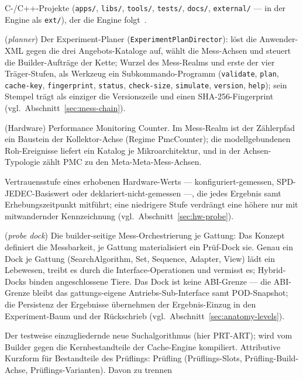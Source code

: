 \begin{description}
  C-/C++-Projekte (\texttt{apps/}, \texttt{libs/}, \texttt{tools/}, \texttt{tests/},
  \texttt{docs/}, \texttt{external/} --- in der Engine als \texttt{ext/}), der die Engine
  folgt~\cite{pike2018pitchfork}.
  \item[Planer] (\emph{planner}) Der Experiment-Planer (\texttt{ExperimentPlanDirector}): löst die
  Anwender-XML gegen die drei Angebots-Kataloge auf, wählt die Mess-Achsen und steuert die
  Builder-Aufträge der Kette; Wurzel des Mess-Realms und erste der vier Träger-Stufen, als Werkzeug
  ein Subkommando-Programm (\texttt{validate}, \texttt{plan}, \texttt{cache-key}, \texttt{fingerprint},
  \texttt{status}, \texttt{check-size}, \texttt{simulate}, \texttt{version}, \texttt{help}); sein Stempel
  trägt als einziger die Versionszeile und einen SHA-256-Fingerprint (vgl.\ Abschnitt~\ref{sec:mess-chain}).
  \item[PMC] (Hardware) Performance Monitoring Counter. Im Mess-Realm ist der Zählerpfad ein
  Baustein der Kollektor-Achse (Regime PmcCounter); die modellgebundenen Roh-Ereignisse liefert ein
  Katalog je Mikroarchitektur, und in der Achsen-Typologie zählt PMC zu den Meta-Meta-Mess-Achsen.
  \item[Provenienz-Stufe] Vertrauensstufe eines erhobenen Hardware-Werts --- konfiguriert-gemessen,
  SPD-JEDEC-Basiswert oder deklariert-nicht-gemessen ---, die jedes Ergebnis samt
  Erhebungszeitpunkt mitführt; eine niedrigere Stufe verdrängt eine höhere nur mit mitwandernder
  Kennzeichnung (vgl.\ Abschnitt~\ref{sec:hw-probe}).
  \item[Prüf-Dock] (\emph{probe dock}) Die builder-seitige Mess-Orchestrierung je Gattung: Das Konzept
  definiert die Messbarkeit, je Gattung materialisiert ein Prüf-Dock sie. Genau ein
  Dock je Gattung (SearchAlgorithm, Set, Sequence, Adapter, View) lädt ein Lebewesen, treibt es durch
  die Interface-Operationen und vermisst es; Hybrid-Docks binden angeschlossene Tiere. Das Dock ist
  keine ABI-Grenze --- die ABI-Grenze bleibt das gattungs-eigene Antriebs-Sub-Interface samt
  POD-Snapshot; die Persistenz der Ergebnisse übernehmen der Ergebnis-Einzug in den
  Experiment-Baum und der Rückschrieb (vgl.\ Abschnitt~\ref{sec:anatomy-levels}).
  \item[Prüfling] Der testweise einzugliedernde neue Suchalgorithmus (hier PRT-ART); wird vom
  Builder gegen die Kernbestandteile der Cache-Engine kompiliert. Attributive Kurzform für Bestandteile
  des Prüflings: Prüfling (Prüflings-Slots, Prüfling-Build-Achse, Prüflings-Varianten). Davon zu trennen

\end{description}
